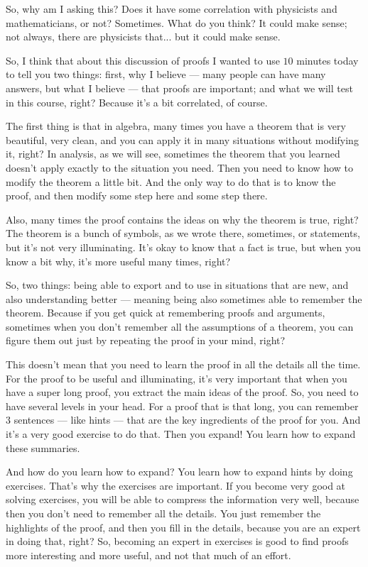 \begin{spoken-clean}[00:26:22 - 00:28:15]
So, why am I asking this? Does it have some correlation with physicists and mathematicians, or not? Sometimes. What do you think? It could make sense; not always, there are physicists that... but it could make sense.

So, I think that about this discussion of proofs I wanted to use $10$ minutes today to tell you two things: first, why I believe --- many people can have many answers, but what I believe --- that proofs are important; and what we will test in this course, right? Because it's a bit correlated, of course.

The first thing is that in algebra, many times you have a theorem that is very beautiful, very clean, and you can apply it in many situations without modifying it, right? In analysis, as we will see, sometimes the theorem that you learned doesn't apply exactly to the situation you need. Then you need to know how to modify the theorem a little bit. And the only way to do that is to know the proof, and then modify some step here and some step there.

Also, many times the proof contains the ideas on why the theorem is true, right? The theorem is a bunch of symbols, as we wrote there, sometimes, or statements, but it's not very illuminating. It's okay to know that a fact is true, but when you know a bit why, it's more useful many times, right?
\end{spoken-clean}

\begin{spoken-clean}[00:28:15 - 00:30:15]
So, two things: being able to export and to use in situations that are new, and also understanding better --- meaning being also sometimes able to remember the theorem. Because if you get quick at remembering proofs and arguments, sometimes when you don't remember all the assumptions of a theorem, you can figure them out just by repeating the proof in your mind, right?

This doesn't mean that you need to learn the proof in all the details all the time. For the proof to be useful and illuminating, it's very important that when you have a super long proof, you extract the main ideas of the proof. So, you need to have several levels in your head. For a proof that is that long, you can remember $3$ sentences --- like hints --- that are the key ingredients of the proof for you. And it's a very good exercise to do that. Then you expand! You learn how to expand these summaries.

And how do you learn how to expand? You learn how to expand hints by doing exercises. That's why the exercises are important. If you become very good at solving exercises, you will be able to compress the information very well, because then you don't need to remember all the details. You just remember the highlights of the proof, and then you fill in the details, because you are an expert in doing that, right? So, becoming an expert in exercises is good to find proofs more interesting and more useful, and not that much of an effort.
\end{spoken-clean}

